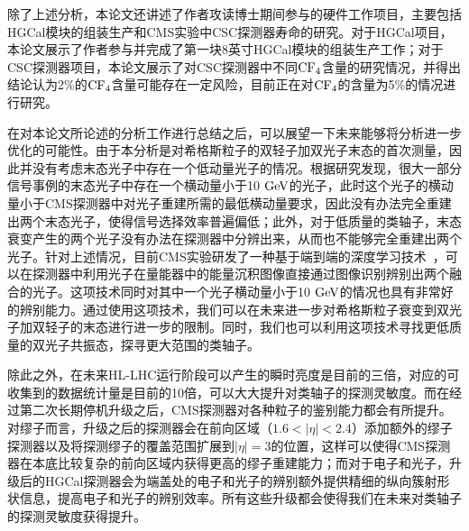 除了上述分析，本论文还讲述了作者攻读博士期间参与的硬件工作项目，主要包括HGCal模块的组装生产和CMS实验中CSC探测器寿命的研究。对于HGCal项目，本论文展示了作者参与并完成了第一块8英寸HGCal模块的组装生产工作；对于CSC探测器项目，本论文展示了对CSC探测器中不同$\mathrm{CF_4}$含量的研究情况，并得出结论认为2\%的$\mathrm{CF_4}$含量可能存在一定风险，目前正在对$\mathrm{CF_4}$的含量为5\%的情况进行研究。

在对本论文所论述的分析工作进行总结之后，可以展望一下未来能够将分析进一步优化的可能性。由于本分析是对希格斯粒子的双轻子加双光子末态的首次测量，因此并没有考虑末态光子中存在一个低动量光子的情况。根据研究发现，很大一部分信号事例的末态光子中存在一个横动量小于10$\GeV$的光子，此时这个光子的横动量小于CMS探测器中对光子重建所需的最低横动量要求，因此没有办法完全重建出两个末态光子，使得信号选择效率普遍偏低；此外，对于低质量的类轴子，末态衰变产生的两个光子没有办法在探测器中分辨出来，从而也不能够完全重建出两个光子。针对上述情况，目前CMS实验研发了一种基于端到端的深度学习技术~\cite{cms2022search}，可以在探测器中利用光子在量能器中的能量沉积图像直接通过图像识别辨别出两个融合的光子。这项技术同时对其中一个光子横动量小于10$\GeV$的情况也具有非常好的辨别能力。通过使用这项技术，我们可以在未来进一步对希格斯粒子衰变到双光子加双轻子的末态进行进一步的限制。同时，我们也可以利用这项技术寻找更低质量的双光子共振态，探寻更大范围的类轴子。

除此之外，在未来HL-LHC运行阶段可以产生的瞬时亮度是目前的三倍，对应的可收集到的数据统计量是目前的10倍，可以大大提升对类轴子的探测灵敏度。而在经过第二次长期停机升级之后，CMS探测器对各种粒子的鉴别能力都会有所提升。对缪子而言，升级之后的探测器会在前向区域（$1.6 < |\eta| < 2.4$）添加额外的缪子探测器以及将探测缪子的覆盖范围扩展到$|\eta| = 3$的位置，这样可以使得CMS探测器在本底比较复杂的前向区域内获得更高的缪子重建能力；而对于电子和光子，升级后的HGCal探测器会为端盖处的电子和光子的辨别额外提供精细的纵向簇射形状信息，提高电子和光子的辨别效率。所有这些升级都会使得我们在未来对类轴子的探测灵敏度获得提升。
